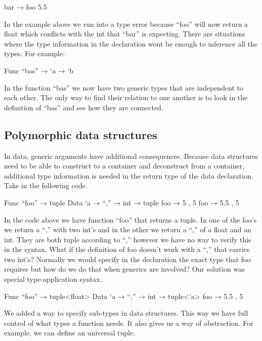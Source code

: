 \begin{code}
	bar → foo 5.5
\end{code}

In the example above we run into a type error because “foo” will now return a float which conflicts with the int that “bar” is expecting.
\linebreak
There are situations where the type information in the declaration wont be enough to inference all the types. For example:

\begin{code}
	Func “bas” → `a → `b
\end{code}

In the function “bas” we now have two generic types that are independent to each other. 
The only way to find their relation to one another is to look in the definition of “bas” and see how they are connected.

\subsection{Polymorphic data structures}

In data, generic arguments have additional consequences. 
Because data structures need to be able to construct to a container and deconstruct from a container, 
additional type information is needed in the return type of the data declaration.
\linebreak
Take in the following code.

\begin{code}
	Func “foo” → tuple
	Data `a → “,” → int → tuple
	foo → 5 , 5
	foo → 5.5 ,  5
\end{code}

In the code above we have function “foo” that returns a tuple. 
In one of the foo’s we return a “,” with two int’s and in the other we return a “,” of a float and an int. 
They are both tuple according to “,” however we have no way to verify this in the syntax. 
What if the definition of foo doesn’t work with a “,” that carries two int’s? 
Normally we would specify in the declaration the exact type that foo requires but how do we do that when generics are involved?
\linebreak
Our solution was special type-application syntax.

\begin{code}
	Func “foo” → tuple<float>
	Data `a → “,” → int → tuple<’a>
	foo → 5.5 ,  5
\end{code}

We added a way to specify sub-types in data structures. 
This way we have full control of what types a function needs. 
It also gives us a way of abstraction. 
For example, we can define an universal tuple.

